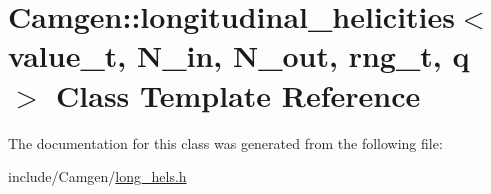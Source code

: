 \hypertarget{a00331}{}\section{Camgen\+:\+:longitudinal\+\_\+helicities$<$ value\+\_\+t, N\+\_\+in, N\+\_\+out, rng\+\_\+t, q $>$ Class Template Reference}
\label{a00331}


The documentation for this class was generated from the following file\+:\begin{DoxyCompactItemize}
\item 
include/\+Camgen/\hyperlink{a00682}{long\+\_\+hels.\+h}\end{DoxyCompactItemize}
